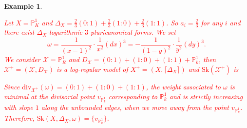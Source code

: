 \documentclass{amsart}%
\numberwithin{equation}{subsection}
\theoremstyle{plain2}
\theoremstyle{definition2}
\newtheorem{example}[equation]{Example}
\theoremstyle{stepstyle}
\theoremstyle{point}
\theoremstyle{subpoint}
\newcommand{\cX}{\ensuremath{\mathscr{X}}}
\newcommand{\divisor}{\mathrm{div}}
\newcommand{\Sk}{\mathrm{Sk}}
\begin{document}
\begin{example}
\textcolor{red}{Let $X=\mathbb{P}^1_K$ and $\Delta_X=\frac{2}{3}(0:1) + \frac{2}{3}(1:0)+\frac{2}{3}(1:1)$. So $a_i=\frac{2}{3}$ for any $i$ and there exist $\Delta_X$-logarithmic $3$-pluricanonical forms. We set $$\omega =  \frac{1}{(x-1)^2} \cdot \frac{1}{x^2} (dx)^3= -\frac{1}{(1-y)^2}\cdot \frac{1}{y^2} (dy)^3.$$ We consider $\cX= \mathbb{P}_R^1$ and $D_\cX= (0:1) + (1:0)+ (1:1)+ \mathbb{P}^1_k$, then $\cX^+=(\cX,D_\cX)$ is a log-regular model of $X^+=(X,\lceil \Delta_X \rceil)$ and $\Sk(\cX^+)$ is \begin{center}
\end{center}
Since $\divisor_{\cX^+}(\omega)= (0:1) + (1:0)+ (1:1)$, the weight associated to $\omega$ is minimal at the divisorial point $v_{\mathbb{P}_k^1}$ corresponding to $\mathbb{P}^1_k$ and is strictly increasing with slope $1$ along the unbounded edges, when we move away from the point $v_{\mathbb{P}^1_k}$. Therefore, $\Sk(X,\Delta_X,\omega)=\{v_{\mathbb{P}^1_k}\}$.}
\end{example}
\end{document}
